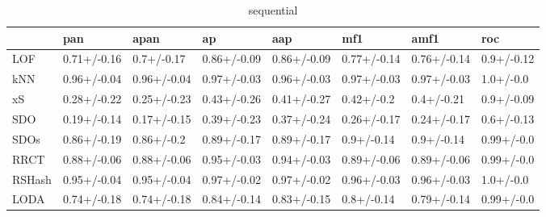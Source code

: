 \begin{table}
\centering
\caption{sequential}
\begin{tabular}{llllllll}
\toprule
{} &          pan &         apan &           ap &          aap &          mf1 &         amf1 &         roc \\
\midrule
LOF    &  0.71+/-0.16 &   0.7+/-0.17 &  0.86+/-0.09 &  0.86+/-0.09 &  0.77+/-0.14 &  0.76+/-0.14 &  0.9+/-0.12 \\
kNN    &  0.96+/-0.04 &  0.96+/-0.04 &  0.97+/-0.03 &  0.96+/-0.03 &  0.97+/-0.03 &  0.97+/-0.03 &   1.0+/-0.0 \\
xS     &  0.28+/-0.22 &  0.25+/-0.23 &  0.43+/-0.26 &  0.41+/-0.27 &   0.42+/-0.2 &   0.4+/-0.21 &  0.9+/-0.09 \\
SDO    &  0.19+/-0.14 &  0.17+/-0.15 &  0.39+/-0.23 &  0.37+/-0.24 &  0.26+/-0.17 &  0.24+/-0.17 &  0.6+/-0.13 \\
SDOs   &  0.86+/-0.19 &   0.86+/-0.2 &  0.89+/-0.17 &  0.89+/-0.17 &   0.9+/-0.14 &   0.9+/-0.14 &  0.99+/-0.0 \\
RRCT   &  0.88+/-0.06 &  0.88+/-0.06 &  0.95+/-0.03 &  0.94+/-0.03 &  0.89+/-0.06 &  0.89+/-0.06 &  0.99+/-0.0 \\
RSHash &  0.95+/-0.04 &  0.95+/-0.04 &  0.97+/-0.02 &  0.97+/-0.02 &  0.96+/-0.03 &  0.96+/-0.03 &   1.0+/-0.0 \\
LODA   &  0.74+/-0.18 &  0.74+/-0.18 &  0.84+/-0.14 &  0.83+/-0.15 &   0.8+/-0.14 &  0.79+/-0.14 &  0.99+/-0.0 \\
\bottomrule
\end{tabular}
\end{table}
